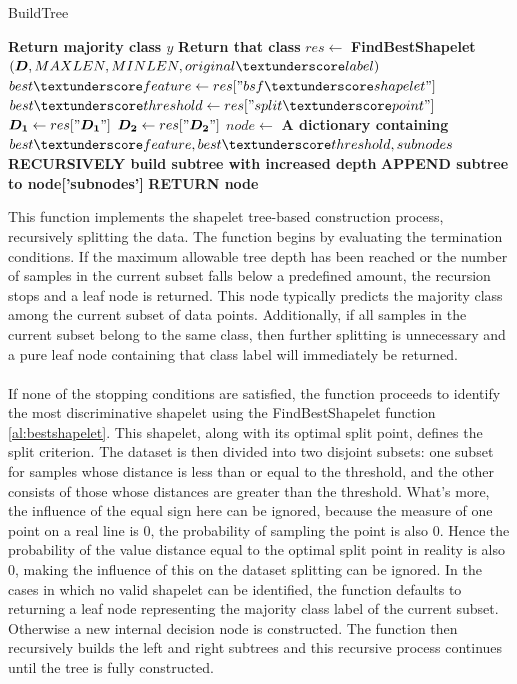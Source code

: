 \begin{algorithm}[H]
	\caption{BuildTree}
	\begin{algorithmic}[1]{
				\State \textbf{Return majority class $y$}
			\EndIf
				\State \textbf{Return that class}
			\EndIf
			\State $res \gets$ \textbf{FindBestShapelet}$(\boldsymbol{D}, MAXLEN, MINLEN, original\textunderscore label)$
			\State $best\textunderscore feature \gets res["bsf \textunderscore shapelet"]$ 			
			\State $best\textunderscore threshold \gets res["split \textunderscore point"]$ 	
			\State $\boldsymbol{D_1} \gets res["\boldsymbol{D_1}"]$
			\State $\boldsymbol{D_2} \gets res["\boldsymbol{D_2}"]$	
			\State $node \gets$ \textbf{A dictionary containing} $best\textunderscore feature, best\textunderscore threshold, subnodes$
				\State \textbf{RECURSIVELY build subtree with increased depth}
				\State \textbf{APPEND subtree to node['subnodes']}
			\EndFor
			\State \textbf{RETURN node}
			\EndProcedure
		}
	\end{algorithmic}
	\label{al:BuildTree}
\end{algorithm}
\noindent This function implements the shapelet tree-based construction process, recursively splitting the data. The function begins by evaluating the termination conditions. If the maximum allowable tree depth has been reached or the number of samples in the current subset falls below a predefined amount, the recursion stops and a leaf node is returned. This node typically predicts the majority class among the current subset of data points. Additionally, if all samples in the current subset belong to the same class, then further splitting is unnecessary and a pure leaf node containing that class label will immediately be returned.\\
\\
If none of the stopping conditions are satisfied, the function proceeds to identify the most discriminative shapelet using the FindBestShapelet function \ref{al:bestshapelet}. This shapelet, along with its optimal split point, defines the split criterion. The dataset is then divided into two disjoint subsets: one subset for samples whose distance is less than or equal to the threshold, and the other consists of those whose distances are greater than the threshold. What's more, the influence of the equal sign here can be ignored, because the measure of one point on a real line is 0, the probability of sampling the point is also 0. Hence the probability of the value distance equal to the optimal split point in reality is also 0, making the influence of this on the dataset splitting can be ignored. In the cases in which no valid shapelet can be identified, the function defaults to returning a leaf node representing the majority class label of the current subset. Otherwise a new internal decision node is constructed. The function then recursively builds the left and right subtrees and this recursive process continues until the tree is fully constructed. \\
